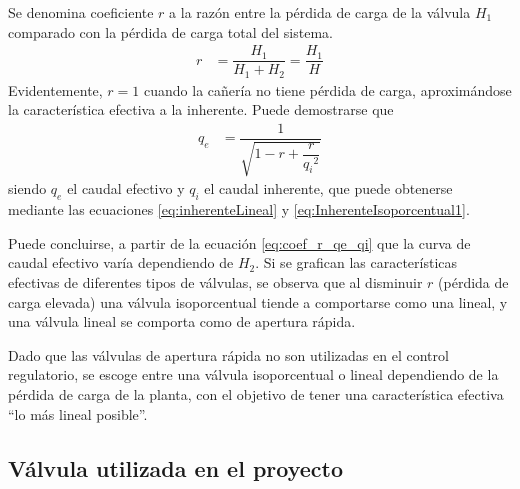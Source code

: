 Se denomina coeficiente $r$ a la razón entre la pérdida de carga de la válvula
$H_1$ comparado con la pérdida de carga total del sistema.
\begin{align}
 r &= \dfrac{H_1}{H_1+H_2} = \dfrac{H_1}{H}
\end{align}
Evidentemente, $r = 1$ cuando la cañería no tiene pérdida de carga,
aproximándose la característica efectiva a la inherente.
Puede demostrarse \cite{bib:Creus} que
\begin{align}
 q_e &= \dfrac{1}{\sqrt{1-r+\dfrac{r}{{q_i}^2}}}
 \label{eq:coef_r_qe_qi}
\end{align}
siendo $q_e$ el caudal efectivo y $q_i$ el caudal inherente, que puede
obtenerse mediante las ecuaciones \eqref{eq:inherenteLineal} y
\eqref{eq:InherenteIsoporcentual1}.

Puede concluirse, a partir de la ecuación \eqref{eq:coef_r_qe_qi} que la curva
de caudal efectivo varía dependiendo de $H_2$.
Si se grafican las características efectivas de diferentes tipos de válvulas,
se observa que al disminuir $r$ (pérdida de carga elevada) una válvula
isoporcentual tiende a comportarse como una lineal,
y una válvula lineal se comporta como de apertura rápida.

Dado que las válvulas de apertura rápida no son utilizadas en el control
regulatorio, se escoge entre una válvula isoporcentual o lineal dependiendo de
la pérdida de carga de la planta, con el objetivo de tener una característica
efectiva ``lo más lineal posible''.

\subsection{Válvula utilizada en el proyecto}

